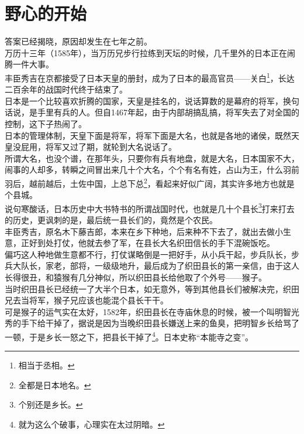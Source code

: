 \section{野心的开始}
\ifnum{}
	\begin{multicols}{\theparacolNo}
\fi
答案已经揭晓，原因却发生在七年之前。\\

万历十三年（1585年），当万历兄步行拉练到天坛的时候，几千里外的日本正在闹腾一件大事。\\

丰臣秀吉在京都接受了日本天皇的册封，成为了日本的最高官员——关白\footnote{相当于丞相。}，长达二百余年的战国时代终于结束了。\\

日本是一个比较喜欢折腾的国家，天皇是挂名的，说话算数的是幕府的将军，换句话说，是手里有兵的人。但自1467年起，由于内部胡搞乱搞，将军失去了对全国的控制，这下子热闹了。\\

日本的管理体制，天皇下面是将军，将军下面是大名，也就是各地的诸侯，既然天皇没屁用，将军又过了期，就轮到大名说话了。\\

所谓大名，也没个谱，在那年头，只要你有兵有地盘，就是大名，日本国家不大，闹事的人却多，转瞬之间冒出来几十个大名，个个有名有姓，占山为王，什么羽前羽后，越前越后，土佐中国，上总下总\footnote{全都是日本地名。}，看起来好似广阔，其实许多地方也就是个县城。\\

说句寒酸话，日本历史中大书特书的所谓战国时代，也就是几十个县长\footnote{个别还是乡长。}打来打去的历史，更讽刺的是，最后统一县长们的，竟然是个农民。\\

丰臣秀吉，原名木下藤吉郎，本来在乡下种地，后来种不下去了，就出去做小生意，正好到处打仗，他就去参了军，在县长大名织田信长的手下混碗饭吃。\\

偏巧这人种地做生意都不行，打仗谋略倒是一把好手，从小兵干起，步兵队长，步兵大队长，家老，部将，一级级地升，最后成为了织田县长的第一亲信，由于这人长得很丑，和猿猴有几分神似，所以织田县长给他取了个外号——猴子。\\

当时织田县长已经统一了大半个日本，如无意外，等到其他县长们被解决完，织田兄去当将军，猴子兄应该也能混个县长干干。\\

可是猴子的运气实在太好，1582年，织田县长在寺庙休息的时候，被一个叫明智光秀的手下给干掉了，据说是因为当晚织田县长嫌送上来的鱼臭，把明智乡长给骂了一顿，于是乡长一怒之下，把县长干掉了\footnote{就为这么个破事，心理实在太过阴暗。}。日本史称“本能寺之变”。\\


\end{multicols}
